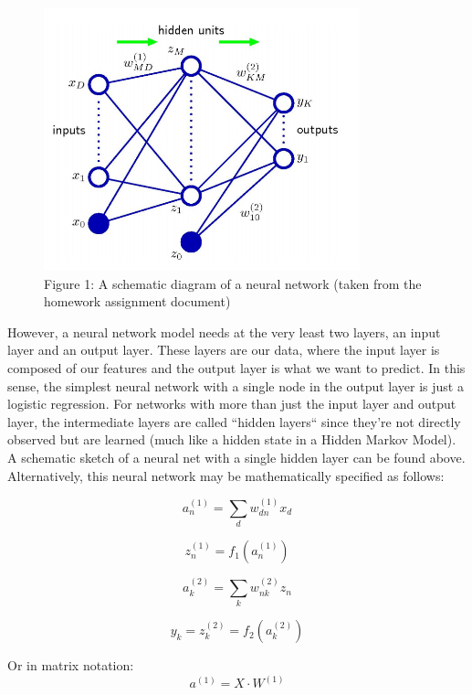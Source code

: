\documentclass[10pt]{article}
\begin{document}
\begin{figure}[ht]
	\centering
	\includegraphics[height=3in]{neuralnetdiagram.png}
	\caption*{Figure 1: A schematic diagram of a neural network (taken from the homework assignment document)}
\end{figure}

However, a neural network model needs at the very least two layers, an input layer and an output layer. These layers are our data, where the input layer is composed of our features and the output layer is what we want to predict. In this sense, the simplest neural network  with a single node in the output layer is just a logistic regression. For networks with more than just the input layer and output layer, the intermediate layers are called ``hidden layers`` since they're not directly observed but are learned (much like a hidden state in a Hidden Markov Model). A schematic sketch of a neural net with a single hidden layer can be found above. Alternatively, this neural network may be mathematically specified as follows:

\begin{equation}
a_{n}^{(1)} = \sum_d w_{dn}^{(1)}x_d
\end{equation}

\begin{equation}
z_{n}^{(1)} = f_1(a_n^{(1)})
\end{equation}

\begin{equation}
a_{k}^{(2)} = \sum_k w_{nk}^{(2)}z_n
\end{equation}

\begin{equation}
y_k = z_{k}^{(2)} = f_2(a_k^{(2)})
\end{equation}

Or in matrix notation:
\begin{equation}
a^{(1)} = X\cdot W^{(1)}	
\end{equation}
\end{document}

